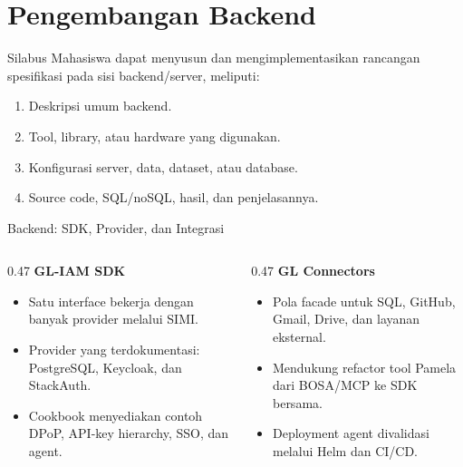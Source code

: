 \section{Pengembangan Backend}

\begin{contentframe}{Silabus}
    \small
    Mahasiswa dapat menyusun dan mengimplementasikan rancangan spesifikasi pada sisi backend/server, meliputi:
    \begin{enumerate}\setlength{\itemsep}{4pt}
        \item Deskripsi umum backend.
        \item Tool, library, atau hardware yang digunakan.
        \item Konfigurasi server, data, dataset, atau database.
        \item Source code, SQL/noSQL, hasil, dan penjelasannya.
    \end{enumerate}
\end{contentframe}

\begin{comparisonframe}{Backend: SDK, Provider, dan Integrasi}
    \begin{columns}[T,onlytextwidth]
        \begin{column}{0.47\textwidth}
            \textbf{GL-IAM SDK}\par
            \begin{itemize}\setlength{\itemsep}{3pt}
                \item Satu interface bekerja dengan banyak provider melalui SIMI.
                \item Provider yang terdokumentasi: PostgreSQL, Keycloak, dan StackAuth.
                \item Cookbook menyediakan contoh DPoP, API-key hierarchy, SSO, dan agent.
            \end{itemize}
        \end{column}
        \begin{column}{0.47\textwidth}
            \textbf{GL Connectors}\par
            \begin{itemize}\setlength{\itemsep}{3pt}
                \item Pola facade untuk SQL, GitHub, Gmail, Drive, dan layanan eksternal.
                \item Mendukung refactor tool Pamela dari BOSA/MCP ke SDK bersama.
                \item Deployment agent divalidasi melalui Helm dan CI/CD.
            \end{itemize}
        \end{column}
    \end{columns}
\end{comparisonframe}

